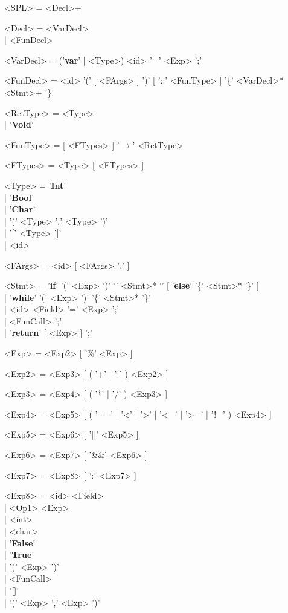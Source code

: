 \documentclass{article}
\begin{document}
\begin{grammar}
<SPL> = <Decl>+

<Decl> = <VarDecl> \\| <FunDecl>

<VarDecl> = ('\textbf{var}' | <Type>) <id> '=' <Exp> ';'

<FunDecl> = <id> '(' [ <FArgs> ] ')' [ '::' <FunType> ] '\{' <VarDecl>* <Stmt>+ '\}'

<RetType> = <Type> \\| '\textbf{Void}'

<FunType> = [ <FTypes> ] '$\rightarrow$' <RetType>

<FTypes> = <Type> [ <FTypes> ]

<Type> = '\textbf{Int}' \\| '\textbf{Bool}' \\| '\textbf{Char}' \\| '(' <Type> ',' <Type> ')' \\| '[' <Type> ']' \\| <id>

<FArgs> = <id> [ <FArgs> ',' ]

<Stmt> = '\textbf{if}' '(' <Exp> ')' '{' <Stmt>* '}' [ '\textbf{else}' '\{' <Stmt>* '\}' ] \\| '\textbf{while}' '(' <Exp> ')' '\{' <Stmt>* '\}' \\| <id> <Field> '=' <Exp> ';' \\| <FunCall> ';' \\| '\textbf{return}' [ <Exp> ] ';'

<Exp> = <Exp2> [ '\%' <Exp> ]

<Exp2> = <Exp3> [ ( '+' | '-' ) <Exp2> ]

<Exp3> = <Exp4> [ ( '*' | '/' ) <Exp3> ]

<Exp4> = <Exp5> [ ( '==' | '\textless' | '\textgreater' | '\textless=' | '\textgreater=' | '!=' ) <Exp4> ]

<Exp5> = <Exp6> [ '||' <Exp5> ]

<Exp6> = <Exp7> [ '\&\&' <Exp6> ]

<Exp7> = <Exp8> [ ':' <Exp7> ]

<Exp8> = <id> <Field> \\| <Op1> <Exp> \\| <int> \\| <char> \\| '\textbf{False}' \\| '\textbf{True}' \\| '(' <Exp> ')' \\| <FunCall> \\| '[]' \\| '(' <Exp> ',' <Exp> ')'


\end{grammar}
\end{document}
